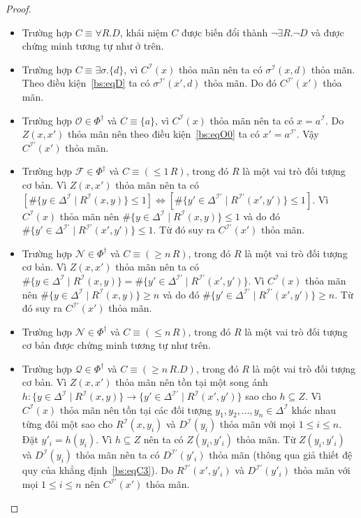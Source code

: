 \documentclass[12pt,a4paper,twoside]{report}
\newcommand{\mI}		{\mathcal{I}}
\newcommand{\mO}		{\mathcal{O}}
\newcommand{\mN}		{\mathcal{N}}
\newcommand{\mQ}		{\mathcal{Q}}
\newcommand{\mF}		{\mathcal{F}}
\newcommand{\PhiDag}	{\Phi^\dag}
\newcommand{\V}			{\forall}
\newcommand{\E}			{\exists}
\renewcommand{\sharp}		{\#}
\theoremstyle{definition}
\begin{document}
\begin{proof}
\begin{itemize}
  \item Trường hợp $C \equiv \V R.D$, khái niệm $C$ được biến đổi thành $\neg \E R.\neg D$ và được chứng minh tương tự như ở trên.
  
  \item Trường hợp $C \equiv \E \sigma.\{d\}$, vì $C^\mI(x)$ thỏa mãn nên ta có $\sigma^\mI(x, d)$ thỏa mãn. Theo điều kiện~\eqref{bs:eqD} ta có $\sigma^{\mI'}(x',d)$ thỏa mãn. Do đó $C^{\mI'}(x')$ thỏa mãn.
  
  \item Trường hợp $\mO \in \PhiDag$ và $C \equiv \{a\}$, vì $C^\mI(x)$ thỏa mãn nên ta có $x=a^\mI$. Do $Z(x,x')$ thỏa mãn nên theo điều kiện~\eqref{bs:eqO0} ta có $x' = a^{\mI'}$. Vậy $C^{\mI'}(x')$ thỏa mãn.
  
  \item Trường hợp $\mF \in \PhiDag$ và $C \equiv (\leq 1\,R)$, trong đó $R$ là một vai trò đối tượng cơ bản. Vì $Z(x,x')$ thỏa mãn nên ta có $[\sharp\{y \in \Delta^\mI \mid R^\mI(x,y)\} \leq 1] \Leftrightarrow [\sharp\{y' \in \Delta^{\mI'} \mid R^{\mI'}(x',y')\} \leq 1]$. Vì $C^\mI(x)$ thỏa mãn nên $\sharp\{y \in \Delta^\mI \mid R^\mI(x,y)\} \leq 1$ và do đó $\sharp\{y' \in \Delta^{\mI'} \mid R^{\mI'}(x',y')\} \leq 1$. Từ đó suy ra $C^{\mI'}(x')$ thỏa mãn.
  
  \item Trường hợp $\mN \in \PhiDag$ và $C \equiv (\geq n\,R)$, trong đó $R$ là một vai trò đối tượng cơ bản. Vì $Z(x,x')$ thỏa mãn nên ta có $\sharp\{y \in \Delta^\mI \mid R^\mI(x,y)\} = \sharp\{y' \in \Delta^{\mI'} \mid R^{\mI'}(x',y')\}$. Vì $C^\mI(x)$ thỏa mãn nên $\sharp\{y \in \Delta^\mI \mid R^\mI(x,y)\} \geq n$ và do đó $\sharp\{y' \in \Delta^{\mI'} \mid R^{\mI'}(x',y')\} \geq n$. Từ đó suy ra $C^{\mI'}(x')$ thỏa mãn.
    
  \item Trường hợp $\mN \in \PhiDag$ và $C \equiv (\leq n\,R)$, trong đó $R$ là một vai trò đối tượng cơ bản được chứng minh tương tự như trên.
  
  \item Trường hợp $\mQ \in \PhiDag$ và $C \equiv (\geq n\,R.D)$, trong đó $R$ là một vai trò đối tượng cơ bản. Vì $Z(x,x')$ thỏa mãn nên tồn tại một song ánh $h : \{y \in \Delta^\mI \mid R^\mI(x,y)\} \rightarrow \{y' \in \Delta^{\mI'} \mid R^\mI(x',y')\}$ sao cho $h \subseteq Z$. Vì $C^\mI(x)$ thỏa mãn nên tồn tại các đối tượng $y_1, y_2, \ldots, y_n \in \Delta^\mI$ khác nhau từng đôi một sao cho $R^\mI(x, y_i)$ và $D^\mI(y_i)$ thỏa mãn với mọi $1 \leq i \leq n$. Đặt $y'_i = h(y_i)$. Vì $h \subseteq Z$ nên ta có $Z(y_i, y'_i)$ thỏa mãn. Từ $Z(y_i, y'_i)$ và $D^\mI(y_i)$ thỏa mãn nên ta có $D^{\mI'}(y'_i)$ thỏa mãn (thông qua giả thiết đệ quy của khẳng định~\eqref{bs:eqC3}). Do $R^{\mI'}(x', y'_i)$ và $D^{\mI'}(y'_i)$ thỏa mãn với mọi $1 \leq i \leq n$ nên $C^{\mI'}(x')$ thỏa mãn.
  

\end{itemize}
\end{proof}
\end{document}
